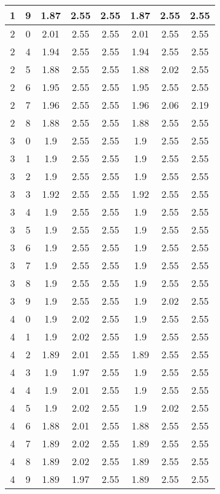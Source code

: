 \begin{longtable}{|c|c||c||c|c||c|c|c|}
	1 & 9 & 1.87 & 2.55 & 2.55 & 1.87 & 2.55 & 2.55 \\ \hline
	2 & 0 & 2.01 & 2.55 & 2.55 & 2.01 & 2.55 & 2.55 \\ \hline
	2 & 4 & 1.94 & 2.55 & 2.55 & 1.94 & 2.55 & 2.55 \\ \hline
	2 & 5 & 1.88 & 2.55 & 2.55 & 1.88 & 2.02 & 2.55 \\ \hline
	2 & 6 & 1.95 & 2.55 & 2.55 & 1.95 & 2.55 & 2.55 \\ \hline
	2 & 7 & 1.96 & 2.55 & 2.55 & 1.96 & 2.06 & 2.19 \\ \hline
	2 & 8 & 1.88 & 2.55 & 2.55 & 1.88 & 2.55 & 2.55 \\ \hline
	3 & 0 & 1.9 & 2.55 & 2.55 & 1.9 & 2.55 & 2.55 \\ \hline
	3 & 1 & 1.9 & 2.55 & 2.55 & 1.9 & 2.55 & 2.55 \\ \hline
	3 & 2 & 1.9 & 2.55 & 2.55 & 1.9 & 2.55 & 2.55 \\ \hline
	3 & 3 & 1.92 & 2.55 & 2.55 & 1.92 & 2.55 & 2.55 \\ \hline
	3 & 4 & 1.9 & 2.55 & 2.55 & 1.9 & 2.55 & 2.55 \\ \hline
	3 & 5 & 1.9 & 2.55 & 2.55 & 1.9 & 2.55 & 2.55 \\ \hline
	3 & 6 & 1.9 & 2.55 & 2.55 & 1.9 & 2.55 & 2.55 \\ \hline
	3 & 7 & 1.9 & 2.55 & 2.55 & 1.9 & 2.55 & 2.55 \\ \hline
	3 & 8 & 1.9 & 2.55 & 2.55 & 1.9 & 2.55 & 2.55 \\ \hline
	3 & 9 & 1.9 & 2.55 & 2.55 & 1.9 & 2.02 & 2.55 \\ \hline
	4 & 0 & 1.9 & 2.02 & 2.55 & 1.9 & 2.55 & 2.55 \\ \hline
	4 & 1 & 1.9 & 2.02 & 2.55 & 1.9 & 2.55 & 2.55 \\ \hline
	4 & 2 & 1.89 & 2.01 & 2.55 & 1.89 & 2.55 & 2.55 \\ \hline
	4 & 3 & 1.9 & 1.97 & 2.55 & 1.9 & 2.55 & 2.55 \\ \hline
	4 & 4 & 1.9 & 2.01 & 2.55 & 1.9 & 2.55 & 2.55 \\ \hline
	4 & 5 & 1.9 & 2.02 & 2.55 & 1.9 & 2.02 & 2.55 \\ \hline
	4 & 6 & 1.88 & 2.01 & 2.55 & 1.88 & 2.55 & 2.55 \\ \hline
	4 & 7 & 1.89 & 2.02 & 2.55 & 1.89 & 2.55 & 2.55 \\ \hline
	4 & 8 & 1.89 & 2.02 & 2.55 & 1.89 & 2.55 & 2.55 \\ \hline
	4 & 9 & 1.89 & 1.97 & 2.55 & 1.89 & 2.55 & 2.55 \\ \hline

\end{longtable}
